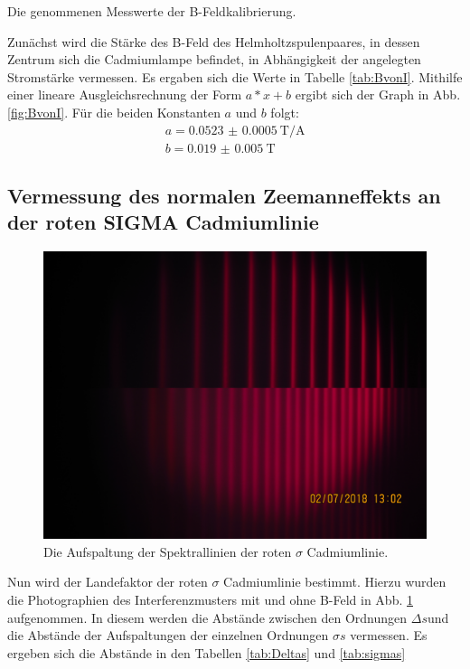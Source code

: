 \begin{table}
	\centering
	\caption{Die genommenen Messwerte der B-Feldkalibrierung.}
	
	
	\label{tab:BvonI}
\end{table}

Zunächst wird die Stärke des B-Feld des Helmholtzspulenpaares, in dessen Zentrum sich die Cadmiumlampe befindet, in Abhängigkeit der angelegten Stromstärke vermessen. Es ergaben sich die Werte in Tabelle \ref{tab:BvonI}. Mithilfe einer lineare Ausgleichsrechnung der Form $a*x+b$ ergibt sich der Graph in Abb. \ref{fig:BvonI}. Für die beiden Konstanten $a$ und $b$ folgt: 
\begin{gather}
	a = \SI{0.0523(5)}{\tesla\per\ampere}\\%
	b = \SI{0.019(5)}{\tesla}
\end{gather}

\subsection{Vermessung des normalen Zeemanneffekts an der roten SIGMA Cadmiumlinie}

\begin{figure}
	\centering
	\includegraphics[width=\linewidth-70pt,height=\textheight-70pt,keepaspectratio]{content/Images/normalb0und1.jpg}
	\caption{Die Aufspaltung der Spektrallinien der roten $\sigma$ Cadmiumlinie.}
	\label{fig:normal}
\end{figure}

Nun wird der Landefaktor der roten $\sigma$ Cadmiumlinie bestimmt. Hierzu wurden die Photographien des Interferenzmusters mit und ohne B-Feld in Abb. \ref{fig:normal} aufgenommen. In diesem werden die Abstände zwischen den Ordnungen $\Delta s$und die Abstände der Aufspaltungen der einzelnen Ordnungen $\sigma s$ vermessen. Es ergeben sich die Abstände in den Tabellen \ref{tab:Deltas} und \ref{tab:sigmas}

